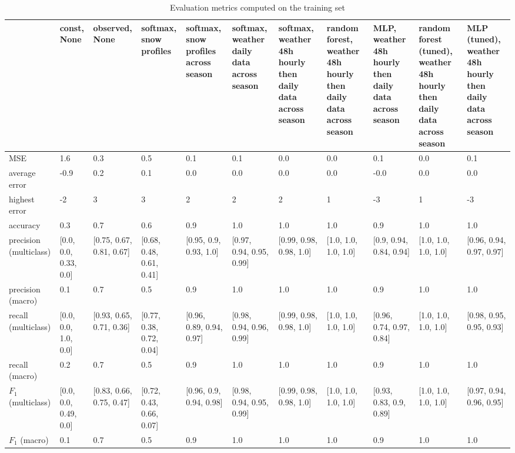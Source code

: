 \begin{table}[H]
\caption{Evaluation metrics computed on the training set}
\label{tbl:sais_eval_training}
\begin{tabular}{lllllllllll}
\toprule
 & const, None & observed, None & softmax, snow profiles & softmax, snow profiles across season & softmax, weather daily data across season & softmax, weather 48h hourly then daily data across season & random forest, weather 48h hourly then daily data across season & MLP, weather 48h hourly then daily data across season & random forest (tuned), weather 48h hourly then daily data across season & MLP (tuned), weather 48h hourly then daily data across season \\
\midrule
MSE & 1.6 & 0.3 & 0.5 & 0.1 & 0.1 & 0.0 & 0.0 & 0.1 & 0.0 & 0.1 \\
average error & -0.9 & 0.2 & 0.1 & 0.0 & 0.0 & 0.0 & 0.0 & -0.0 & 0.0 & 0.0 \\
highest error & -2 & 3 & 3 & 2 & 2 & 2 & 1 & -3 & 1 & -3 \\
accuracy & 0.3 & 0.7 & 0.6 & 0.9 & 1.0 & 1.0 & 1.0 & 0.9 & 1.0 & 1.0 \\
precision (multiclass) & [0.0, 0.0, 0.33, 0.0] & [0.75, 0.67, 0.81, 0.67] & [0.68, 0.48, 0.61, 0.41] & [0.95, 0.9, 0.93, 1.0] & [0.97, 0.94, 0.95, 0.99] & [0.99, 0.98, 0.98, 1.0] & [1.0, 1.0, 1.0, 1.0] & [0.9, 0.94, 0.84, 0.94] & [1.0, 1.0, 1.0, 1.0] & [0.96, 0.94, 0.97, 0.97] \\
precision (macro) & 0.1 & 0.7 & 0.5 & 0.9 & 1.0 & 1.0 & 1.0 & 0.9 & 1.0 & 1.0 \\
recall (multiclass) & [0.0, 0.0, 1.0, 0.0] & [0.93, 0.65, 0.71, 0.36] & [0.77, 0.38, 0.72, 0.04] & [0.96, 0.89, 0.94, 0.97] & [0.98, 0.94, 0.96, 0.99] & [0.99, 0.98, 0.98, 1.0] & [1.0, 1.0, 1.0, 1.0] & [0.96, 0.74, 0.97, 0.84] & [1.0, 1.0, 1.0, 1.0] & [0.98, 0.95, 0.95, 0.93] \\
recall (macro) & 0.2 & 0.7 & 0.5 & 0.9 & 1.0 & 1.0 & 1.0 & 0.9 & 1.0 & 1.0 \\
$F_1$ (multiclass) & [0.0, 0.0, 0.49, 0.0] & [0.83, 0.66, 0.75, 0.47] & [0.72, 0.43, 0.66, 0.07] & [0.96, 0.9, 0.94, 0.98] & [0.98, 0.94, 0.95, 0.99] & [0.99, 0.98, 0.98, 1.0] & [1.0, 1.0, 1.0, 1.0] & [0.93, 0.83, 0.9, 0.89] & [1.0, 1.0, 1.0, 1.0] & [0.97, 0.94, 0.96, 0.95] \\
$F_1$ (macro) & 0.1 & 0.7 & 0.5 & 0.9 & 1.0 & 1.0 & 1.0 & 0.9 & 1.0 & 1.0 \\
\bottomrule
\end{tabular}
\end{table}
